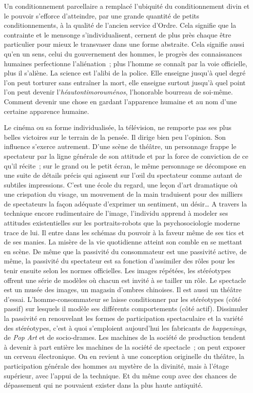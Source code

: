 \documentclass[french,twoside]{book} %
\begin{document}
\noindent Un conditionnement parcellaire a remplacé l’ubiquité du conditionnement divin et le pouvoir s’efforce d’atteindre, par une grande quantité de petits conditionnements, à la qualité de l’ancien service d’Ordre. Cela signifie que la contrainte et le mensonge s’individualisent, cernent de plus près chaque être particulier pour mieux le transvaser dans une forme abstraite. Cela signifie aussi qu’en un sens, celui du gouvernement des hommes, le progrès des connaissances humaines perfectionne l’aliénation ; plus l’homme se connaît par la voie officielle, plus il s’aliène. La science est l’alibi de la police. Elle enseigne jusqu’à quel degré l’on peut torturer sans entraîner la mort, elle enseigne surtout jusqu’à quel point l’on peut devenir l’\emph{héautontimorouménos}, l’honorable bourreau de soi-même. Comment devenir une chose en gardant l’apparence humaine et au nom d’une certaine apparence humaine.\par
Le cinéma ou sa forme individualisée, la télévision, ne remporte pas ses plus belles victoires sur le terrain de la pensée. Il dirige bien peu l’opinion. Son influence s’exerce autrement. D’une scène de théâtre, un personnage frappe le spectateur par la ligne générale de son attitude et par la force de conviction de ce qu’il récite ; sur le grand ou le petit écran, le même personnage se décompose en une suite de détails précis qui agissent sur l’œil du spectateur comme autant de subtiles impressions. C’est une école du regard, une leçon d’art dramatique où une crispation du visage, un mouvement de la main traduisent pour des milliers de spectateurs la façon adéquate d’exprimer un sentiment, un désir… A travers la technique encore rudimentaire de l’image, l’individu apprend à modeler ses attitudes existentielles sur les portraits-robots que la psychosociologie moderne trace de lui. Il entre dans les schémas du pouvoir à la faveur même de ses tics et de ses manies. La misère de la vie quotidienne atteint son comble en se mettant en scène. De même que la passivité du consommateur est une passivité active, de même, la passivité du spectateur est sa fonction d’assimiler des rôles pour les tenir ensuite selon les normes officielles. Les images répétées, les stéréotypes offrent une série de modèles où chacun est invité à se tailler un rôle. Le spectacle est un musée des images, un magasin d’ombres chinoises. Il est aussi un théâtre d’essai. L’homme-consommateur se laisse conditionner par les stéréotypes (côté passif) sur lesquels il modèle ses différents comportements (côté actif). Dissimuler la passivité en renouvelant les formes de participation spectaculaire et la variété des stéréotypes, c’est à quoi s’emploient aujourd’hui les fabricants de \emph{happenings}, de \emph{Pop Art} et de socio-drames. Les machines de la société de production tendent à devenir à part entière les machines de la société de spectacle ; on peut exposer un cerveau électronique. On en revient à une conception originelle du théâtre, la participation générale des hommes au mystère de la divinité, mais à l’étage supérieur, avec l’appui de la technique. Et du même coup avec des chances de dépassement qui ne pouvaient exister dans la plus haute antiquité.\par
\end{document}
